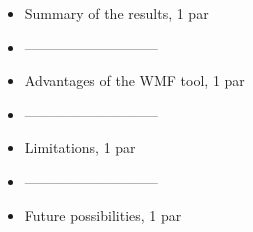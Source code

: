 \begin{itemize}
    \item Summary of the results, 1 par
    \item -----------------------------
    \item Advantages of the WMF tool, 1 par
    \item -----------------------------
    \item Limitations, 1 par
    \item -----------------------------
    \item Future possibilities, 1 par
\end{itemize}